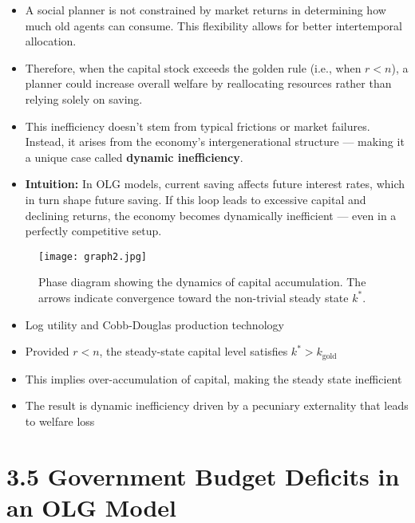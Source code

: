 \documentclass[12pt]{article}
\begin{document}
\begin{itemize}
\item A social planner is not constrained by market returns in determining how much old agents can consume. This flexibility allows for better intertemporal allocation.

\item Therefore, when the capital stock exceeds the golden rule (i.e., when \( r < n \)), a planner could increase overall welfare by reallocating resources rather than relying solely on saving.

\item This inefficiency doesn’t stem from typical frictions or market failures. Instead, it arises from the economy’s intergenerational structure — making it a unique case called \textbf{dynamic inefficiency}.

\item \textbf{Intuition:} In OLG models, current saving affects future interest rates, which in turn shape future saving. If this loop leads to excessive capital and declining returns, the economy becomes dynamically inefficient — even in a perfectly competitive setup.
\end{itemize}

\begin{figure}[H]
    \centering
    \texttt{[image: graph2.jpg]}
    \caption{Phase diagram showing the dynamics of capital accumulation. The arrows indicate convergence toward the non-trivial steady state \( k^* \).}
    \label{fig:phase_k_dynamics}
\end{figure}

\begin{itemize}
\item Log utility and Cobb-Douglas production technology

\item Provided \( r < n \), the steady-state capital level satisfies \( k^* > k_{\text{gold}} \)

\item This implies over-accumulation of capital, making the steady state inefficient

\item The result is dynamic inefficiency driven by a pecuniary externality that leads to welfare loss
\end{itemize}

\section*{\noindent\textbf{3.5 Government Budget Deficits in an OLG Model}}
\end{document}
